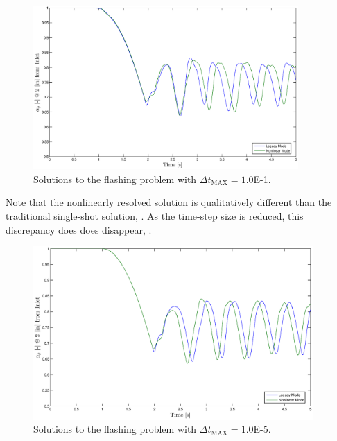 \begin{figure}[h!t]
\begin{center}
\includegraphics[width=0.9\textwidth]{images/flashing_1em1.eps}
\end{center}
\caption{Solutions to the flashing problem with $\Delta t_{\text{MAX}} = 1.0$E-1.}
\label{fig:flashing_1em1}
\end{figure}


Note that the nonlinearly resolved solution is qualitatively different than the traditional single-shot solution, .
As the time-step size is reduced, this discrepancy does does disappear, .


\begin{figure}[h!t]
\begin{center}
\includegraphics[width=0.95\textwidth]{images/flashing_1em5.eps}
\end{center}
\caption{Solutions to the flashing problem with $\Delta t_{\text{MAX}} = 1.0$E-5.}
\label{fig:flashing_1em5}
\end{figure}

